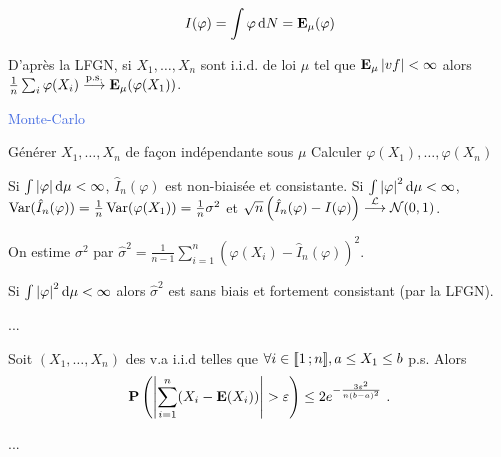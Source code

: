 $$I(\varphi) = \int \varphi \mathop{}\mathopen{}\mathrm{d} N = \mathbf{E}_\mu(\varphi)$$

D'après la LFGN, si $X_1,\ldots,X_n$ sont i.i.d. de loi $\mu$ tel que $\mathbf{E}_\mu \left\lvert vf\right\rvert < \infty$ alors $\frac{1}{n} \sum_i \varphi(X_i) \overset{\text{p.s.}}{\longrightarrow} \mathbf{E}_\mu (\varphi(X_1))$.

\begin{algorithm}[h]
\caption{\textcolor{RoyalBlue}{Monte-Carlo}}
	Générer $X_1,\ldots,X_n$ de façon indépendante sous $\mu$ \;
	Calculer $\varphi(X_1),\ldots,\varphi(X_n)$ \;
\end{algorithm}

\begin{pop}
	Si $\int \left\lvert\varphi\right\rvert \mathop{}\mathopen{}\mathrm{d} \mu < \infty$, $\hat{I}_n(\varphi)$ est non-biaisée et consistante.
	Si $\int \left\lvert\varphi\right\rvert^2 \mathop{}\mathopen{}\mathrm{d} \mu < \infty$, $\operatorname{Var}(\hat{I}_n(\varphi)) = \frac{1}{n} \operatorname{Var}(\varphi(X_1)) = \frac{1}{n} \sigma^2$ et $\sqrt{n} \left( \hat{I}_n(\varphi) - I(\varphi) \right) \overset{\mathcal{L}}{\longrightarrow} \mathcal{N}(0,1)$.
\end{pop}

On estime $\sigma^2$ par $\hat{\sigma}^2 = \frac{1}{n - 1} \sum_{i = 1}^n \left( \varphi(X_i) - \hat{I}_n(\varphi) \right)^2$.

\begin{pop}
	Si $\int \left\lvert\varphi\right\rvert^2 \mathop{}\mathopen{}\mathrm{d} \mu < \infty$ alors $\hat \sigma^2$ est sans biais et fortement consistant (par la LFGN).
\end{pop}

...

\begin{thm}
	Soit $(X_1,\ldots,X_n)$ des v.a i.i.d telles que $\forall i \in \mathopen{[\![}1\mathclose{}\mathpunct{};n\mathclose{]\!]}, a \leq X_1 \leq b$ p.s.
	Alors
	$$\mathbf{P} \left( \left\lvert\sum_{i = 1}^n (X_i - \mathbf{E}(X_i)) \right\rvert > \varepsilon \right) \leq 2 e^{- \frac{3 \varepsilon^2}{n(b - a)^2}}\ .$$
\end{thm}

...
